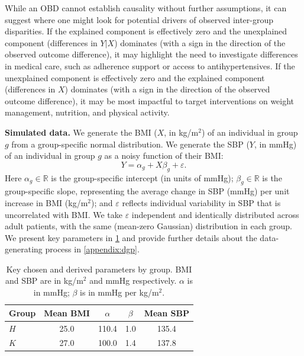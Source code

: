 While an OBD cannot establish causality without further assumptions, it can suggest where one might look for potential drivers of observed inter-group disparities.
If the explained component is effectively zero and the unexplained component (differences in $Y|X$) dominates (with a sign in the direction of the observed outcome difference), it may highlight the need to investigate differences in medical care, such as adherence support or access to antihypertensives.
If the unexplained component is effectively zero and the explained component (differences in $X$) dominates (with a sign in the direction of the observed outcome difference), it may be most impactful to target interventions on weight management, nutrition, and physical activity. 

\textbf{Simulated data.}
We generate the BMI ($X$, in kg/m$^2$) of an individual in group \( g \) from a group-specific normal distribution.
We generate the SBP ($Y$, in mmHg) of an individual in group \( g \) as a noisy function of their BMI:
\begin{equation}
    \label{eq:linear_model}
   Y = \alpha_g + X \beta_g + \varepsilon.
\end{equation}
Here $\alpha_g \in \mathbb{R}$ is the group-specific intercept (in units of mmHg); $\beta_g \in \mathbb{R}$ is the group-specific slope, representing the average change in SBP (mmHg) per unit increase in BMI (kg/m$^2$); and $\varepsilon$ reflects individual variability in SBP that is uncorrelated with BMI. We take $\varepsilon$ independent and identically distributed across adult patients, with the same (mean-zero Gaussian) distribution in each group.
We present key parameters in \cref{tab:dgp_short} and provide further details about the data-generating process in \cref{appendix:dgp}.

\begin{table}[h]
\caption{Key chosen and derived parameters by group. BMI and SBP are in kg/m$^2$ and mmHg respectively. $\alpha$ is in mmHg; $\beta$ is in mmHg per kg/m$^2$.}
\label{tab:dgp_short}
\begin{center}
\small
\begin{tabular}{lcccc}
\toprule
Group & Mean BMI & $\alpha$ & $\beta$ & Mean SBP \\
\midrule
$H$ & 25.0 & 110.4 & 1.0 & 135.4 \\
$K$ & 27.0 & 100.0 & 1.4 & 137.8 \\
\bottomrule
\end{tabular}
\end{center}
\vskip -0.1in
\end{table}


